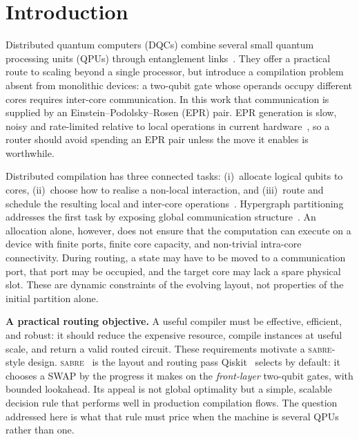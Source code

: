 \documentclass[journal]{IEEEtran}
\newcommand{\SABRE}{\textsc{sabre}}
\begin{document}
\section{Introduction}
\label{sec:intro}

Distributed quantum computers (DQCs) combine several small quantum processing
units (QPUs) through entanglement links~\cite{cuomo2020towards}. They offer a
practical route to scaling beyond a single processor, but introduce a
compilation problem absent from monolithic devices: a two-qubit gate whose
operands occupy different cores requires inter-core communication. In this
work that communication is supplied by an Einstein--Podolsky--Rosen (EPR)
pair. EPR generation is slow, noisy and rate-limited relative to local
operations in current hardware~\cite{stephenson2020high,daiss2021quantum}, so
a router should avoid spending an EPR pair unless the move it enables is
worthwhile.

Distributed compilation has three connected tasks: (i)~allocate logical
qubits to cores, (ii)~choose how to realise a non-local interaction, and
(iii)~route and schedule the resulting local and inter-core
operations~\cite{escofet2024review}. Hypergraph partitioning addresses the first task
by exposing global communication structure~\cite{andres2019automated,pytketdqc2024}.
An allocation alone, however, does not ensure that the computation can execute
on a device with finite ports, finite core capacity, and non-trivial intra-core
connectivity. During routing, a state may have to be moved to a communication
port, that port may be occupied, and the target core may lack a spare physical
slot. These are dynamic constraints of the evolving layout, not properties of
the initial partition alone.

\textbf{A practical routing objective.}
A useful compiler must be effective, efficient, and robust: it should reduce
the expensive resource, compile instances at useful scale, and return a valid
routed circuit. These
requirements motivate a \SABRE{}-style design. \SABRE{}~\cite{li2019tackling}
is the layout and routing pass Qiskit~\cite{qiskit2024} selects by default: it
chooses a SWAP by the progress it makes on the \emph{front-layer}
two-qubit gates, with bounded lookahead. Its appeal is not global optimality
but a simple, scalable decision rule that performs well in production
compilation flows. The question addressed here is what that rule must price
when the machine is several QPUs rather than one.
\end{document}
